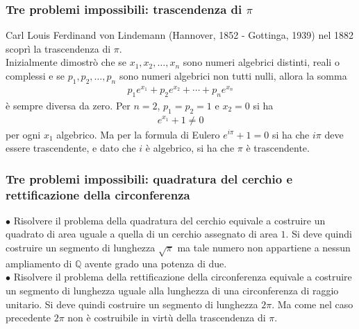 \documentclass[11pt]{beamer}
\begin{document}
\begin{frame}
\frametitle{Tre problemi impossibili: trascendenza di $\pi$}


Carl Louis Ferdinand von Lindemann (Hannover, 1852 - Gottinga, 1939) nel 1882 scoprì la trascendenza di $\pi$. \\ Inizialmente dimostrò che se $x_1, x_2, \dots, x_n$ sono numeri algebrici distinti, reali o complessi e se $p_1, p_2, \dots, p_n$ sono numeri algebrici non tutti nulli, allora la somma
\begin{align*}
p_1 e^{x_1} + p_2 e^{x_2} + \cdots + p_n e^{x_n}  
\end{align*}
\noindent
è sempre diversa da zero. Per $n = 2$, $p_1 = p_2 = 1$ e $x_2 = 0$ si ha 
\begin{align*}
e^{x_1} + 1 \neq 0  
\end{align*}
\noindent
per ogni $x_1$ algebrico. Ma per la formula di Eulero $e^{i\pi} + 1 = 0$ si ha che $i\pi$ deve essere trascendente, e dato che $i$ è algebrico, si ha che $\pi$ è trascendente.
\end{frame}

%

\begin{frame}
\frametitle{Tre problemi impossibili: quadratura del cerchio e rettificazione della circonferenza}

$\bullet$ Risolvere il problema della quadratura del cerchio equivale a costruire un quadrato di area uguale a quella di un cerchio assegnato di area $1$. Si deve quindi costruire un segmento di lunghezza $\sqrt{\pi}$ ma tale numero non appartiene a nessun ampliamento di $\mathbb{Q}$ avente grado una potenza di due.
\\
$\bullet$ Risolvere il problema della rettificazione della circonferenza equivale a costruire un segmento di lunghezza uguale alla lunghezza di una circonferenza di raggio unitario. Si deve quindi costruire un segmento di lunghezza $2\pi$. Ma come nel caso precedente $2\pi$ non è costruibile in virtù della trascendenza di $\pi$.

\end{frame}
\end{document}
